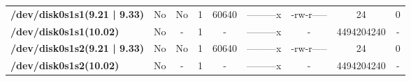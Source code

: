 \begin{center}
{\begin{tabular}{|>{\bfseries} l | C | C | C | C | C | C | C | C |}
					/dev/disk0s1s1(9.21 | 9.33) & No & No & \color{green}1 & \color{red}60640 & \color{green}---------x & \color{red}-rw-r----- & \color{green}24 & \color{red}0\\ 
					/dev/disk0s1s1(10.02) & No & - & 1 & - & ---------x & - & 4494204240 & -\\ 
					/dev/disk0s1s2(9.21 | 9.33) & No & No & \color{green}1 & \color{red}60640 & \color{green}---------x & \color{red}-rw-r----- & \color{green}24 & \color{red}0\\ 
					/dev/disk0s1s2(10.02) & No & - & 1 & - & ---------x & - & 4494204240 & -\\ 

			\end{tabular}
		}
	\end{center}



